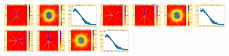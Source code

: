 \documentclass[11pt]{article}
\begin{document}
\includegraphics[width=0.11875\textwidth]{frame0029fig3.png}
\vskip 10pt 
\includegraphics[width=0.11875\textwidth]{frame0030fig0.png}
\includegraphics[width=0.11875\textwidth]{frame0030fig1.png}
\includegraphics[width=0.11875\textwidth]{frame0030fig2.png}
\includegraphics[width=0.11875\textwidth]{frame0030fig3.png}
\includegraphics[width=0.11875\textwidth]{frame0031fig0.png}
\includegraphics[width=0.11875\textwidth]{frame0031fig1.png}
\includegraphics[width=0.11875\textwidth]{frame0031fig2.png}
\includegraphics[width=0.11875\textwidth]{frame0031fig3.png}
\vskip 10pt 
\includegraphics[width=0.11875\textwidth]{frame0032fig0.png}
\includegraphics[width=0.11875\textwidth]{frame0032fig1.png}
\end{document}
